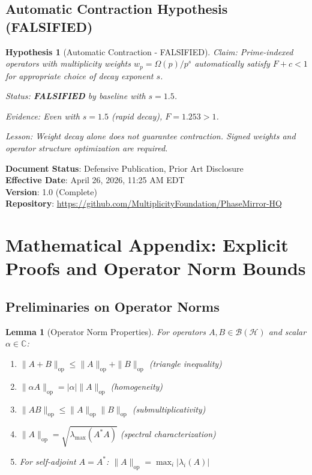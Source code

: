 \documentclass[11pt,a4paper]{article}
\newtheorem{lemma}{Lemma}
\newtheorem{hypothesis}{Hypothesis}
\begin{document}
\subsection{Automatic Contraction Hypothesis (FALSIFIED)}

\begin{hypothesis}[Automatic Contraction - FALSIFIED]
\emph{Claim}: Prime-indexed operators with multiplicity weights \(w_p = \Omega(p)/p^s\) automatically satisfy \(F+c<1\) for appropriate choice of decay exponent \(s\).

\emph{Status}: \textbf{FALSIFIED} by baseline with \(s=1.5\).

\emph{Evidence}: Even with \(s=1.5\) (rapid decay), \(F=1.253>1\).

\emph{Lesson}: Weight decay alone does not guarantee contraction. Signed weights and operator structure optimization are required.
\end{hypothesis}

\vspace{2em}

\noindent\textbf{Document Status}: Defensive Publication, Prior Art Disclosure \\
\textbf{Effective Date}: April 26, 2026, 11:25 AM EDT \\
\textbf{Version}: 1.0 (Complete) \\
\textbf{Repository}: \url{https://github.com/MultiplicityFoundation/PhaseMirror-HQ}

\appendix

\section{Mathematical Appendix: Explicit Proofs and Operator Norm Bounds}

\subsection{Preliminaries on Operator Norms}

\begin{lemma}[Operator Norm Properties]
\label{lem:op-norm-properties}
For operators \(A, B \in \mathcal{B}(\mathcal{H})\) and scalar \(\alpha \in \mathbb{C}\):
\begin{enumerate}
\item \(\|A + B\|_{\mathrm{op}} \leq \|A\|_{\mathrm{op}} + \|B\|_{\mathrm{op}}\) (triangle inequality)
\item \(\|\alpha A\|_{\mathrm{op}} = |\alpha| \|A\|_{\mathrm{op}}\) (homogeneity)
\item \(\|AB\|_{\mathrm{op}} \leq \|A\|_{\mathrm{op}} \|B\|_{\mathrm{op}}\) (submultiplicativity)
\item \(\|A\|_{\mathrm{op}} = \sqrt{\lambda_{\max}(A^* A)}\) (spectral characterization)
\item For self-adjoint \(A = A^*\): \(\|A\|_{\mathrm{op}} = \max_i |\lambda_i(A)|\)
\end{enumerate}
\end{lemma}
\end{document}
